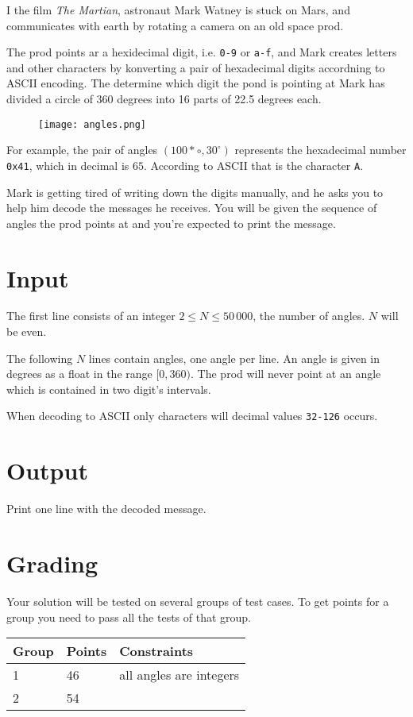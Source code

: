 
I the film \emph{The Martian}, astronaut Mark Watney is stuck on Mars, and communicates with earth by rotating a camera on an old space prod.

The prod points ar a hexidecimal digit, i.e. \texttt{0-9} or \texttt{a-f}, and Mark creates letters and other characters by konverting a pair
of hexadecimal digits accordning to ASCII encoding. The determine which digit the pond is pointing at Mark has divided a circle of 360 degrees into 16 parts of 22.5 degrees each.

\begin{figure}[h!]
  \begin{center}
    \texttt{[image: angles.png]}
  \end{center}
\end{figure}

For example, the pair of angles $(100*{\circ}, 30^{\circ})$ represents the hexadecimal number \texttt{0x41}, which in decimal is $65$.
According to ASCII that is the character \texttt{A}.

Mark is getting tired of writing down the digits manually, and he asks you to help him decode the messages he receives. You will be given the sequence of angles the prod points at and you're expected to print the message.

\section*{Input}
The first line consists of an integer $2 \le N \le 50\,000$, the number of angles. $N$ will be even.

The following $N$ lines contain angles, one angle per line. An angle is given in degrees as a float in the range $[0, 360)$.
The prod will never point at an angle which is contained in two digit's intervals.

When decoding to ASCII only characters will decimal values \texttt{32-126} occurs.

\section*{Output}
Print one line with the decoded message.

\section*{Grading}
Your solution will be tested on several groups of test cases. To get points for a group you need to pass all the tests of that group.

\begin{tabular}{| l | l | l |}
	\hline
	Group & Points & Constraints\\ \hline
  1     & 46         & all angles are integers \\ \hline
  2     & 54         & \\ \hline
\end{tabular}
